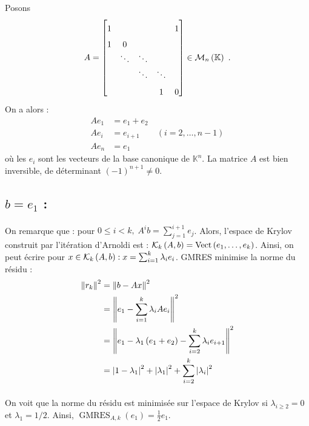   \paragraph{}
  Posons
  \[A = \begin{bmatrix}
    1 &        & \D     &        & 1 \\
    1 & 0      & \D     &        &   \\
      & \ddots & \ddots &        &   \\
    \D& \D     & \ddots & \ddots & \D\\
      &        & \D     & 1      & 0
  \end{bmatrix} \in \matrixsymb{n}{K}\ .\]
  On a alors :
  \begin{align*}
    Ae_1 &= e_1 + e_2 \\
    Ae_i &= e_{i+1} \qquad \left(i = 2, \dots, n-1\right) \\
    Ae_n &= e_1
  \end{align*}
  où les $e_i$ sont les vecteurs de la base canonique de $\mathbb{K}^n$.
  La matrice $A$ est bien inversible, de déterminant $\left(-1\right)^{n+1} \neq 0$.


\subsection*{\underline{$b = e_1$} :}

  \paragraph{}
  On remarque que : pour $0 \le i < k,\; A^ib = \sum_{j=1}^{i+1} e_j$.
  Alors, l'espace de Krylov construit par l'itération d'Arnoldi est : $\krylov[A, b]{k} = \operatorname{Vect}\left(e_1, \dots, e_k\right)$.
  Ainsi, on peut écrire pour $x\in\krylov[A, b]{k} : x = \sum_{i=1}^k \lambda_i e_i$.
  GMRES minimise la norme du résidu :
  \begin{align*}
    \norm{r_k}^2 &= \norm{b - Ax}^2 \\
                 &= \norm{e_1 - \sum_{i=1}^k \lambda_i Ae_i}^2 \\
                 &= \norm{e_1 - \lambda_1 \left(e_1 + e_2\right) - \sum_{i=2}^k \lambda_i e_{i+1}}^2 \\
                 &= \left|1 - \lambda_1\right|^2 + \left|\lambda_1\right|^2 + \sum_{i=2}^k \left|\lambda_i\right|^2
  \end{align*}

  \paragraph{}
  On voit que la norme du résidu est minimisée sur l'espace de Krylov si $\lambda_{i\geq 2} = 0$ et $\lambda_1 = 1/2$.
  Ainsi, $\operatorname{GMRES}_{A, k}\left(e_1\right) = \frac{1}{2}e_1$.


